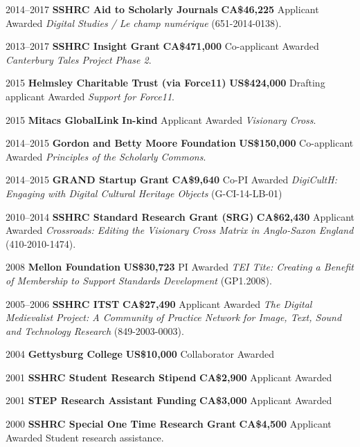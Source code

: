 \documentclass[11pt,letterpaper,sans]{moderncv}
\begin{document}
{\cventry
  {2014--2017}
  {\textbf{SSHRC Aid to Scholarly Journals}}
  {\textbf{CA\$46{,}225}}
  {Applicant}
  {Awarded}
  {\emph{Digital Studies / Le champ numérique} (651-2014-0138).}

\cventry
  {2013--2017}
  {\textbf{SSHRC Insight Grant}}
  {\textbf{CA\$471{,}000}}
  {Co-applicant}
  {Awarded}
  {\emph{Canterbury Tales Project Phase 2}.}

\cventry
  {2015}
  {\textbf{Helmsley Charitable Trust (via Force11)}}
  {\textbf{US\$424{,}000}}
  {Drafting applicant}
  {Awarded}
  {\emph{Support for Force11}.}

\cventry
  {2015}
  {\textbf{Mitacs GlobalLink}}
  {\textbf{In-kind}}
  {Applicant}
  {Awarded}
  {\emph{Visionary Cross}.}

\cventry
  {2014--2015}
  {\textbf{Gordon and Betty Moore Foundation}}
  {\textbf{US\$150{,}000}}
  {Co-applicant}
  {Awarded}
  {\emph{Principles of the Scholarly Commons}.}

\cventry
  {2014--2015}
  {\textbf{GRAND Startup Grant}}
  {\textbf{CA\$9{,}640}}
  {Co-PI}
  {Awarded}
  {\emph{DigiCultH: Engaging with Digital Cultural Heritage Objects} (G-CI-14-LB-01)}

\cventry
  {2010--2014}
  {\textbf{SSHRC Standard Research Grant (SRG)}}
  {\textbf{CA\$62{,}430}}
  {Applicant}
  {Awarded}
  {\emph{Crossroads: Editing the Visionary Cross Matrix in Anglo-Saxon England} (410-2010-1474).}

\cventry
  {2008}
  {\textbf{Mellon Foundation}}
  {\textbf{US\$30{,}723}}
  {PI}
  {Awarded}
  {\emph{TEI Tite: Creating a Benefit of Membership to Support Standards Development} (GP1.2008).}

\cventry
  {2005--2006}
  {\textbf{SSHRC ITST}}
  {\textbf{CA\$27{,}490}}
  {Applicant}
  {Awarded}
  {\emph{The Digital Medievalist Project: A Community of Practice Network for Image, Text, Sound and Technology Research} (849-2003-0003).}

\cventry
  {2004}
  {\textbf{Gettysburg College}}
  {\textbf{US\$10{,}000}}
  {Collaborator}
  {Awarded}
  {}

\cventry
  {2001}
  {\textbf{SSHRC Student Research Stipend}}
  {\textbf{CA\$2{,}900}}
  {Applicant}
  {Awarded}
  {}

\cventry
  {2001}
  {\textbf{STEP Research Assistant Funding}}
  {\textbf{CA\$3{,}000}}
  {Applicant}
  {Awarded}
  {}

\cventry
  {2000}
  {\textbf{SSHRC Special One Time Research Grant}}
  {\textbf{CA\$4{,}500}}
  {Applicant}
  {Awarded}
  {Student research assistance.}

}
\end{document}
